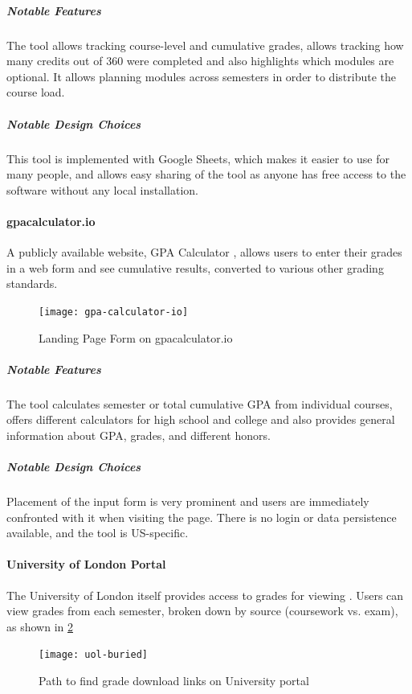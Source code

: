 \subparagraph{Notable Features}
The tool allows tracking course-level and cumulative grades, allows tracking how many credits out of 360 were completed and also highlights which modules are optional. It allows planning modules across semesters in order to distribute the course load.

\subparagraph{Notable Design Choices}
This tool is implemented with Google Sheets, which makes it easier to use for many people, and allows easy sharing of the tool as anyone has free access to the software without any local installation.

\paragraph{gpacalculator.io}

A publicly available website, GPA Calculator \cite{gpa_calculator}, allows users to enter their grades in a web form and see cumulative results, converted to various other grading standards.

\begin{figure}[H] 
\noindent \texttt{[image: gpa-calculator-io]}
\centering
\caption{Landing Page Form on gpacalculator.io}
\label{fig:gpa-calc}
\end{figure}
\medskip

\subparagraph{Notable Features}
The tool calculates semester or total cumulative GPA from individual courses, offers different calculators for high school and college and also provides general information about GPA, grades, and different honors.

\subparagraph{Notable Design Choices}
Placement of the input form is very prominent and users are immediately confronted with it when visiting the page. There is no login or data persistence available, and the tool is US-specific.

\paragraph{University of London Portal}

The University of London itself provides access to grades for viewing \cite{uol}. Users can view grades from each semester, broken down by source (coursework vs. exam), as shown in \cref{fig:uol-grades}

\begin{figure}[H]
\noindent \texttt{[image: uol-buried]}
\centering
\caption{Path to find grade download links on University portal}
\label{fig:uol-grades}
\end{figure}

